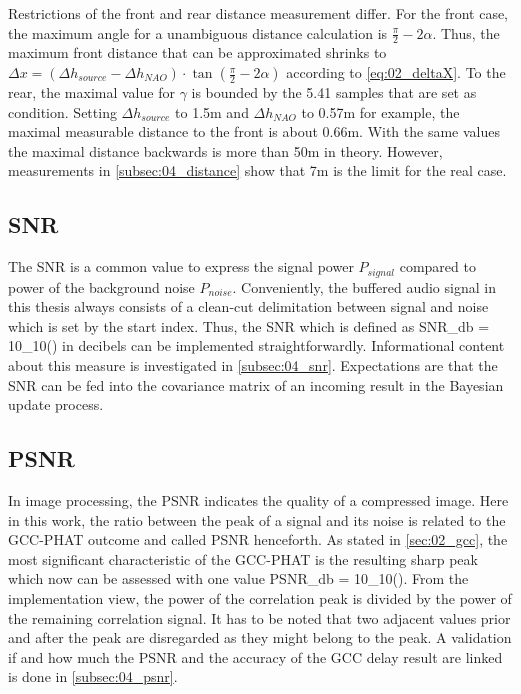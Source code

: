 Restrictions of the front and rear distance measurement differ.
For the front case, the maximum angle for a unambiguous distance calculation
is $\frac{\pi}{2}- 2\alpha$.
Thus, the maximum front distance that can be approximated shrinks to
$\Delta x = (\Delta h_{source} - \Delta h_{NAO}) \cdot \tan(\frac{\pi}{2} - 2\alpha)$
according to \cref{eq:02_deltaX}.
To the rear, the maximal value for $\gamma$ is bounded by the 5.41 samples that
are set as condition.
Setting $\Delta h_{source}$ to 1.5\si{m} and $\Delta h_{NAO}$ to 0.57\si{\meter} for example,
the maximal measurable distance to the front is about 0.66\si{\meter}.
With the same values the maximal distance backwards is more than 50\si{\meter} in theory.
However, measurements in \cref{subsec:04_distance} show that 7\si{\meter} is the
limit for the real case. 


\subsection{SNR}
\label{subsec:03_snr}

The \acf{SNR} is a common value to express the signal power $P_{signal}$ compared
to power of the background noise $P_{noise}$.
Conveniently, the buffered audio signal in this thesis always consists of
a clean-cut delimitation between signal and noise which is set by the
start index.
Thus, the \ac{SNR} which is defined as
\bal
    SNR_{db} = 10\log_{10}\left(\right)
    \label{eq:03_snr}
\eal
in decibels can be implemented straightforwardly.
Informational content about this measure is investigated in \cref{subsec:04_snr}.
Expectations are that the \ac{SNR} can be fed into the covariance matrix
of an incoming result in the Bayesian update process.

\subsection{PSNR}
\label{subsec:03_psnr}
In image processing, the \acf{PSNR} indicates the quality of a compressed
image. Here in this work, the ratio between the peak of a signal
and its noise is related to the \ac{GCC-PHAT} outcome and called \ac{PSNR}
henceforth.
As stated in \cref{sec:02_gcc}, the most significant characteristic
of the \ac{GCC-PHAT} is the resulting sharp peak which now can be
assessed with one value
\bal
    PSNR_{db} = 10\log_{10}\left(\right).
    \label{eq:03_psnr}
\eal
From the implementation view, the power of the correlation peak is divided by
the power of the remaining correlation signal.
It has to be noted that two adjacent values prior and after the peak
are disregarded as they might belong to the peak.
A validation if and how much the \ac{PSNR} and the accuracy of the \ac{GCC}
delay result are linked is done in \cref{subsec:04_psnr}.